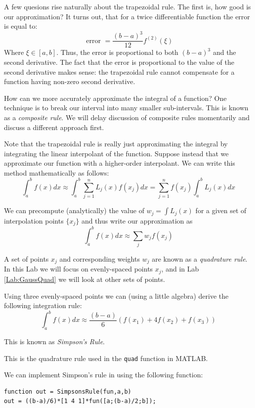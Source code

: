 A few quesions rise naturally about the trapezoidal rule. The first is, how good is our approximation? It turns out, that for a twice differentiable function the error is equal to:
\[
\mbox{ error } = \frac{(b-a)^3}{12}f^{(2)}(\xi)
\]
Where $\xi \in [a,b]$. Thus, the error is proportional to both $(b-a)^3$ and the second derivative. The fact that the error is proportional to the value of the second derivative makes sense: the trapezoidal rule cannot compensate for a function having non-zero second derivative.

How can we more accurately approximate the integral of a function? One technique is to break our interval into many smaller sub-intervals. This is known as a \emph{composite rule}. We will delay discussion of composite rules momentarily and discuss a different approach first.

Note that the trapezoidal rule is really just approximating the integral by integrating the linear interpolant of the function. Suppose instead that we approximate our function with a higher-order interpolant. We can write this method mathematically as follows:
\[
\int_a^b f(x) dx \approx \int_a^b \sum_{j=1}^n L_j(x)f(x_j) dx = \sum_{j=1}^n f(x_j)\int_a^b L_j(x) dx
\]

We can precompute (analytically) the value of $w_j = \int L_j(x)$ for a given set of interpolation points $\{x_j\}$ and thus write our approximation as
\[
\int_a^b f(x) dx \approx \sum_j w_j f(x_j)
\]

A set of points $x_j$ and corresponding weights $w_j$ are known as a \emph{quadrature rule}. In this Lab we will focus on evenly-spaced points $x_j$, and in Lab \ref{Lab:GaussQuad} we will look at other sets of points.

Using three evenly-spaced points we can (using a little algebra) derive the following integration rule:
\[
\int_a^b f(x) dx \approx \frac{(b-a)}{6}\left(f(x_1) + 4 f(x_2) + f(x_3)\right)
\]

This is known as \emph{Simpson's Rule}. \begin{matlab} This is the quadrature rule used in the {\tt quad} function in MATLAB.\end{matlab} We can implement Simpson's rule in \ProgrammingLanguage using the following function:
\begin{matlab}
\begin{lstlisting}[style=matlab]
function out = SimpsonsRule(fun,a,b)
out = ((b-a)/6)*[1 4 1]*fun([a;(b-a)/2;b]);
\end{lstlisting}
\end{matlab}

